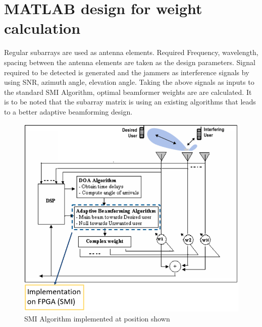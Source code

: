 \section{MATLAB design for weight calculation}
Regular subarrays are used as antenna elements. Required Frequency, wavelength, spacing between the antenna elements are taken as the design parameters. Signal required to be detected is generated and the jammers as interference signals by using SNR, azimuth angle, elevation angle. Taking the above signals as inputs to the standard SMI Algorithm, optimal beamformer weights are are calculated. It is to be noted that the subarray matrix is using an existing algorithms that leads to a better adaptive beamforming design.

\begin{figure}[H]
\centering
	\includegraphics[scale=0.7]{Chapter3/Figures/matlab_algo}	
	\caption{\label{fig:matlab_algo}SMI Algorithm implemented at position shown}
\end{figure}